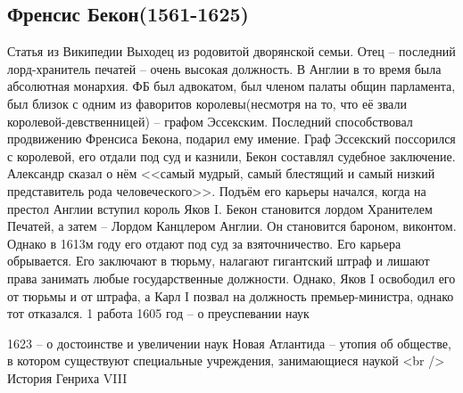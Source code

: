 \subsection{Френсис Бекон(1561-1625)}

Статья из Википедии Выходец из родовитой дворянской семьи. Отец – последний лорд-хранитель печатей – очень высокая должность. В Англии в то время была абсолютная монархия. ФБ был адвокатом, был членом палаты общин парламента, был близок с одним из фаворитов королевы(несмотря на то, что её звали королевой-девственницей) – графом Эссекским. Последний способствовал продвижению Френсиса Бекона, подарил ему имение. Граф Эссекский поссорился с королевой, его отдали под суд и казнили, Бекон составлял судебное заключение. Александр сказал о нём <<самый мудрый, самый блестящий и самый низкий представитель рода человеческого>>. Подъём его карьеры начался, когда на престол Англии вступил король Яков I. Бекон становится лордом Хранителем Печатей, а затем – Лордом Канцлером Англии. Он становится бароном, виконтом. Однако в 1613м году его отдают под суд за взяточничество. Его карьера обрывается. Его заключают в тюрьму, налагают гигантский штраф и лишают права занимать любые государственные должности. Однако, Яков I освободил его от тюрьмы и от штрафа, а Карл I позвал на должность премьер-министра, однако тот отказался. 1 работа 1605 год – о преуспевании наук

     1623 – о достоинстве и увеличении наук
	Новая Атлантида – утопия об обществе, в котором существуют специальные 		учреждения, занимающиеся наукой <br />
	История Генриха VIII

